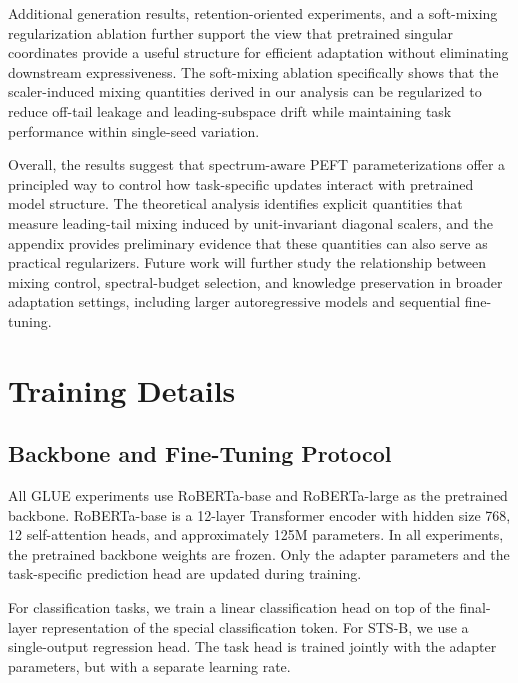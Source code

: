 \documentclass{article}
\begin{document}
Additional generation results, retention-oriented experiments, and a
soft-mixing regularization ablation further support the view that pretrained
singular coordinates provide a useful structure for efficient adaptation
without eliminating downstream expressiveness. The soft-mixing ablation
specifically shows that the scaler-induced mixing quantities derived in our
analysis can be regularized to reduce off-tail leakage and leading-subspace
drift while maintaining task performance within single-seed variation.

Overall, the results suggest that spectrum-aware PEFT parameterizations offer
a principled way to control how task-specific updates interact with pretrained
model structure. The theoretical analysis identifies explicit quantities that
measure leading-tail mixing induced by unit-invariant diagonal scalers, and the
appendix provides preliminary evidence that these quantities can also serve as
practical regularizers. Future work will further study the relationship between mixing control, spectral-budget selection, and knowledge preservation in broader adaptation settings, including larger autoregressive models and sequential fine-tuning.


\newpage %
{
\small


}



\appendix
\section{Training Details}
\label{app:training_details}

\subsection{Backbone and Fine-Tuning Protocol}

All GLUE experiments use RoBERTa-base and RoBERTa-large as the pretrained backbone. RoBERTa-base is a 12-layer Transformer encoder with hidden size 768, 12 self-attention heads, and approximately 125M parameters. In all experiments, the pretrained backbone weights are frozen. Only the adapter parameters and the task-specific prediction head are updated during training.

For classification tasks, we train a linear classification head on top of the final-layer representation of the special classification token. For STS-B, we use a single-output regression head. The task head is trained jointly with the adapter parameters, but with a separate learning rate.
\end{document}
